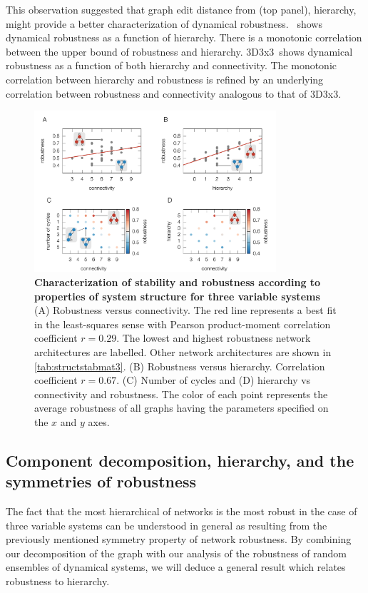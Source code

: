 This observation suggested that graph edit distance from  (top panel), hierarchy, might provide a better characterization of dynamical robustness. $\,$ shows dynamical robustness as a function of hierarchy. There is a monotonic correlation between the upper bound of robustness and hierarchy. 3D3x3$\,$ shows dynamical robustness as a function of both hierarchy and connectivity. The monotonic correlation between hierarchy and robustness is refined by an underlying correlation between robustness and connectivity analogous to that of 3D3x3.

\begin{figure}[!ht]
\centering
\noindent\includegraphics[width=0.8\textwidth]{fig/combinedfigs.pdf}
\caption{{\bf Characterization of stability and robustness according to properties of system structure for three variable systems} (A) Robustness versus connectivity. The red line represents a best fit in the least-squares sense with Pearson product-moment correlation coefficient $r=0.29$. The lowest and highest robustness network architectures are labelled. Other network architectures are shown in \ref{tab:structstabmat3}. (B) Robustness versus hierarchy. Correlation coefficient $r=0.67$. (C) Number of cycles and (D) hierarchy vs connectivity and robustness. The color of each point represents the average robustness of all graphs having the parameters specified on the $x$ and $y$ axes.
}
\label{fig:combined}
\end{figure}

\subsection{Component decomposition, hierarchy, and the symmetries of robustness}

The fact that the most hierarchical of networks is the most robust in the case of three variable systems can be understood in general as resulting from the previously mentioned symmetry property of network robustness.  By combining our decomposition of the graph with our analysis of the robustness of random ensembles of dynamical systems, we will deduce a general result which relates robustness to hierarchy.

